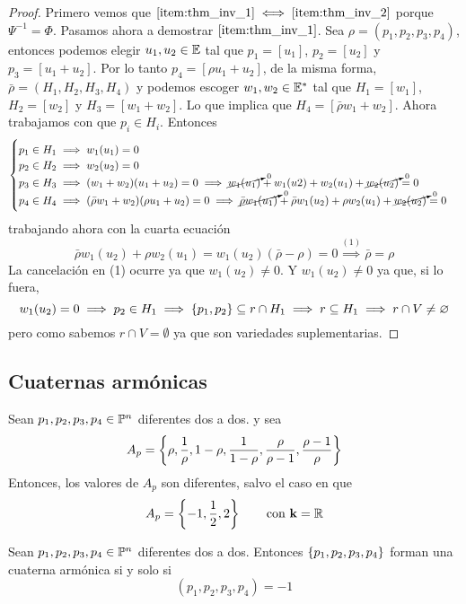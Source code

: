 \begin{proof}
 Primero vemos que $\ref{item:thm_inv_1} \iff \ref{item:thm_inv_2}$ porque $\Psi^{-1}=\Phi$. Pasamos ahora
 a demostrar $\ref{item:thm_inv_1}$. Sea $\rho = (p_1,p_2,p_3,p_4)$, entonces podemos elegir $u_1,u_2 \in \mathbb{E}$
 tal que $p_1 = [u_1]$, $p_2=[u_2]$ y $p_3=[u_1+u_2]$. Por lo tanto $p_4 = [\rho u_1+u_2]$, de la misma forma,
 $\bar{\rho} = (H_1,H_2,H_3,H_4)$ y podemos escoger $w_1,w_2 \in \mathbb{E}^*$ tal que $H_1 = [w_1]$, $H_2 = [w_2]$ y
 $H_3=[w_1+w_2]$. Lo que implica que $H_4 = [\bar{\rho} w_1 + w_2]$. Ahora trabajamos con que $p_i \in H_i$.
 Entonces
 \[
  \begin{cases}
    p_1 \in H_1 \implies w_1(u_1) = 0 \\
    p_2 \in H_2 \implies w_2(u_2) = 0 \\
    p_3 \in H_3 \implies (w_1+w_2)(u_1+u_2) = 0 \implies \cancelto{0}{w_1(u_1)} + w_1(u2) + w_2(u_1) + \cancelto{0}{w_2(u_2)} = 0 \\
    p_4 \in H_4 \implies (\bar{\rho}w_1+w_2)(\rho u_1+u_2) = 0 \implies \cancelto{0}{\bar{\rho}w_1(u_1)} + \bar{\rho}w_1(u_2) +
      \rho w_2(u_1) + \cancelto{0}{w_2(u_2)} = 0
  \end{cases}
 \]
 trabajando ahora con la cuarta ecuación
 \[
  \bar{\rho}w_1(u_2) + \rho w_2(u_1) = w_1(u_2)(\bar{\rho} - \rho) = 0 \stackrel{(1)}{\implies} \bar{\rho} = \rho
 \]
 La cancelación en (1) ocurre ya que $w_1(u_2) \neq 0$. Y $w_1(u_2) \neq 0$ ya que, si lo fuera,
 \[
  w_1(u_2) = 0 \implies p_2 \in H_1 \implies \left\{p_1,p_2\right\} \subseteq r \cap H_1 \implies r \subseteq H_1 \implies r \cap V \neq \varnothing
 \]
 pero como sabemos $r \cap V = \emptyset$ ya que son variedades suplementarias.
\end{proof}

\subsection{Cuaternas armónicas}

\begin{obs}
 Sean $p_1,p_2,p_3,p_4 \in \mathbb{P}^n$ diferentes dos a dos. y sea
 \[
  A_p = \left\{\rho, \frac{1}{\rho}, 1-\rho, \frac{1}{1-\rho}, \frac{\rho}{\rho-1},\frac{\rho-1}{\rho}\right\}
 \]
 Entonces, los valores de $A_p$ son diferentes, salvo el caso en que
 \[
  A_p = \left\{-1,\frac{1}{2},2\right\} \qquad \text{con $\mathbf{k} = \mathbb{R}$}
 \]
\end{obs}

\begin{defi}
 Sean $p_1,p_2,p_3,p_4 \in \mathbb{P}^n$ diferentes dos a dos. Entonces $\left\{p_1,p_2,p_3,p_4\right\}$ forman
 una cuaterna armónica si y solo si
 \[
  (p_1,p_2,p_3,p_4) = -1
 \]
\end{defi}

